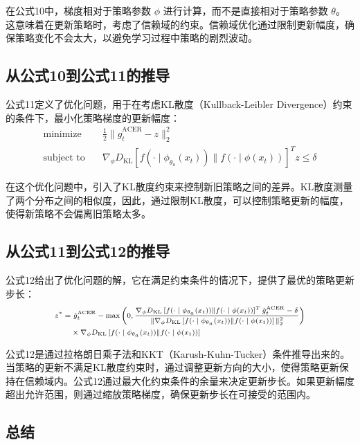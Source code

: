\documentclass[twocolumn, 10pt]{article} %
\theoremstyle{remark}
\begin{document}
在公式10中，梯度相对于策略参数 \( \phi \) 进行计算，而不是直接相对于策略参数 \( \theta \)。这意味着在更新策略时，考虑了信赖域的约束。信赖域优化通过限制更新幅度，确保策略变化不会太大，以避免学习过程中策略的剧烈波动。

\subsection{从公式10到公式11的推导}

公式11定义了优化问题，用于在考虑KL散度（Kullback-Leibler Divergence）约束的条件下，最小化策略梯度的更新幅度：
\[
\begin{aligned}
\text{minimize} \quad &\frac{1}{2} \| \hat{g}_t^{\text{ACER}} - z \|^2_2 \\
\text{subject to} \quad &\nabla_\phi D_{\text{KL}} \left[ f(\cdot \mid \phi_{\theta_a}(x_t)) \| f(\cdot \mid \phi(x_t)) \right]^T z \leq \delta
\end{aligned}
\]

在这个优化问题中，引入了KL散度约束来控制新旧策略之间的差异。KL散度测量了两个分布之间的相似度，因此，通过限制KL散度，可以控制策略更新的幅度，使得新策略不会偏离旧策略太多。

\subsection{从公式11到公式12的推导}

公式12给出了优化问题的解，它在满足约束条件的情况下，提供了最优的策略更新步长：
\[
\scriptsize
\begin{aligned}
z^* = &\ \hat{g}_t^{\text{ACER}} - \max \left( 0, \frac{\nabla_\phi D_{\text{KL}} \left[ f(\cdot \mid \phi_{\theta_a}(x_t)) \| f(\cdot \mid \phi(x_t)) \right]^T \hat{g}_t^{\text{ACER}} - \delta}{\| \nabla_\phi D_{\text{KL}} \left[ f(\cdot \mid \phi_{\theta_a}(x_t)) \| f(\cdot \mid \phi(x_t)) \right] \|^2_2} \right) \\
&\times \nabla_\phi D_{\text{KL}} \left[ f(\cdot \mid \phi_{\theta_a}(x_t)) \| f(\cdot \mid \phi(x_t)) \right]
\end{aligned}
\]

公式12是通过拉格朗日乘子法和KKT（Karush-Kuhn-Tucker）条件推导出来的。当策略的更新不满足KL散度约束时，通过调整更新方向的大小，使得策略更新保持在信赖域内。公式12通过最大化约束条件的余量来决定更新步长。如果更新幅度超出允许范围，则通过缩放策略梯度，确保更新步长在可接受的范围内。

\subsection{总结}
\end{document}
